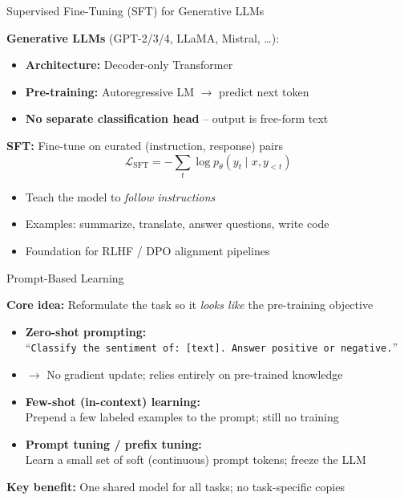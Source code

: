 \documentclass[11pt,compress,t,notes=noshow, xcolor=table]{beamer}
\begin{document}
\begin{frame}{Supervised Fine-Tuning (SFT) for Generative LLMs}

\vfill

\textbf{Generative LLMs} (GPT-2/3/4, LLaMA, Mistral, \ldots):
\begin{itemize}
  \item \textbf{Architecture:} Decoder-only Transformer
  \item \textbf{Pre-training:} Autoregressive LM $\to$ predict next token
  \item \textbf{No separate classification head} -- output is free-form text
\end{itemize}

\vfill

\textbf{SFT:} Fine-tune on curated (instruction, response) pairs
$$\mathcal{L}_\text{SFT} = -\sum_{t} \log p_\theta(y_t \mid x, y_{<t})$$

\begin{itemize}
  \item Teach the model to \textit{follow instructions}
  \item Examples: summarize, translate, answer questions, write code
  \item Foundation for RLHF / DPO alignment pipelines
\end{itemize}

\vfill

\end{frame}


\begin{frame}{Prompt-Based Learning}

\vfill

\textbf{Core idea:} Reformulate the task so it \textit{looks like} the pre-training objective

\begin{itemize}
  \item \textbf{Zero-shot prompting:}\\
        ``\texttt{Classify the sentiment of: [text]. Answer positive or negative.}''
  \item[] $\to$ No gradient update; relies entirely on pre-trained knowledge
  \item \textbf{Few-shot (in-context) learning:}\\
        Prepend a few labeled examples to the prompt; still no training
  \item \textbf{Prompt tuning / prefix tuning:}\\
        Learn a small set of soft (continuous) prompt tokens; freeze the LLM
\end{itemize}

\vfill

\textbf{Key benefit:} One shared model for all tasks; no task-specific copies

\vfill

\end{frame}
\end{document}
